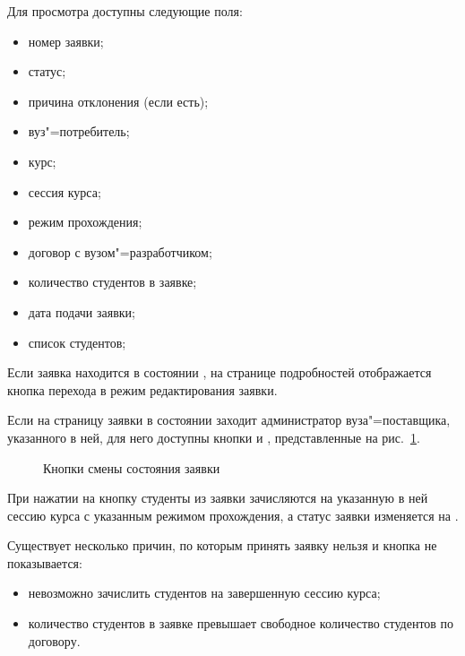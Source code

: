 Для просмотра доступны следующие поля:
\begin{itemize}
	\item номер заявки;
	\item статус;
	\item причина отклонения (если есть);
	\item вуз"=потребитель;
	\item курс;
	\item сессия курса;
	\item режим прохождения;
	\item договор с вузом"=разработчиком;
	\item количество студентов в заявке;
	\item дата подачи заявки;
	\item список студентов;
\end{itemize}

Если заявка находится в состоянии , на странице подробностей 
отображается кнопка перехода в режим редактирования заявки. 


Если на страницу заявки в состоянии  заходит администратор вуза"=поставщика, 
указанного в ней, для него доступны кнопки  и , 
представленные на рис.~\ref{img:student:req_detail_buttons}.
\begin{figure}[H]
	\caption{Кнопки смены состояния заявки}
	\label{img:student:req_detail_buttons}
\end{figure}

При нажатии на кнопку  студенты из заявки зачисляются на указанную в ней сессию курса 
с указанным режимом прохождения, а статус заявки изменяется на .

Существует несколько причин, по которым принять заявку нельзя и кнопка  не показывается:
\begin{itemize}
	\item невозможно зачислить студентов на завершенную сессию курса;
	\item количество студентов в заявке превышает свободное количество студентов по договору.
\end{itemize}

